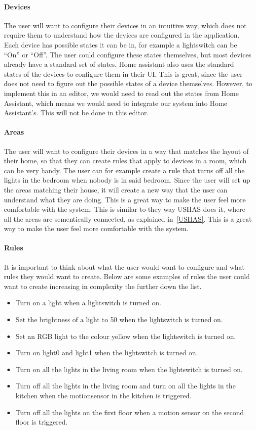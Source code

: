 \documentclass[11pt,a4paper]{report}
\begin{document}
\paragraph{Devices}
The user will want to configure their devices in an intuitive way, which does not require them to understand how the devices are configured in the application. Each device has possible states it can be in, for example a lightswitch can be ``On'' or ``Off''. The user could configure these states themselves, but most devices already have a standard set of states. Home assistant also uses the standard states of the devices to configure them in their UI. This is great, since the user does not need to figure out the possible states of a device themselves. However, to implement this in an editor, we would need to read out the states from Home Assistant, which means we would need to integrate our system into Home Assistant's. This will not be done in this editor.
\paragraph{Areas}
The user will want to configure their devices in a way that matches the layout of their home, so that they can create rules that apply to devices in a room, which can be very handy. The user can for example create a rule that turns off all the lights in the bedroom when nobody is in said bedroom. Since the user will set up the areas matching their house, it will create a new way that the user can understand what they are doing. This is a great way to make the user feel more comfortable with the system. This is similar to they way USHAS does it, where all the areas are sementically connected, as explained in~\ref{USHAS}. This is a great way to make the user feel more comfortable with the system.
\paragraph{Rules}
It is important to think about what the user would want to configure and what rules they would want to create. Below are some examples of rules the user could want to create increasing in complexity the further down the list.
\begin{itemize}
    \item Turn on a light when a lightswitch is turned on.
    \item Set the brightness of a light to 50 when the lightswitch is turned on.
    \item Set an RGB light to the colour yellow when the lightswitch is turned on.
    \item Turn on light0 and light1 when the lightswitch is turned on.
    \item Turn on all the lights in the living room when the lightswitch is turned on.
    \item Turn off all the lights in the living room and turn on all the lights in the kitchen when the motionsensor in the kitchen is triggered.
    \item Turn off all the lights on the first floor when a motion sensor on the second floor is triggered.
\end{itemize}
\end{document}
